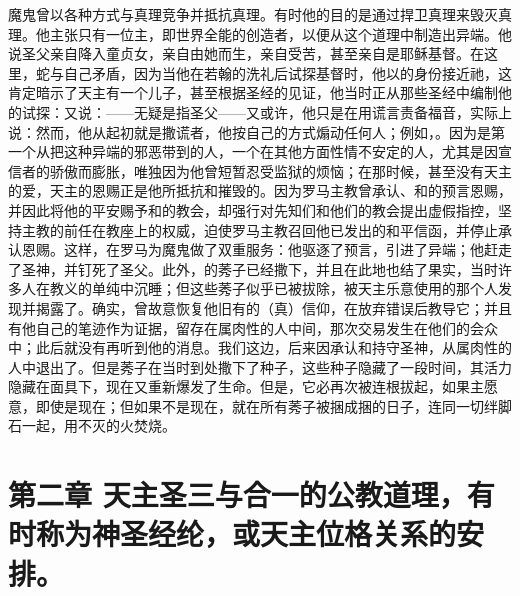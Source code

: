 魔鬼曾以各种方式与真理竞争并抵抗真理。有时他的目的是通过捍卫真理来毁灭真理。他主张只有一位主，即世界全能的创造者，以便从这个道理中制造出异端。他说圣父亲自降入童贞女，亲自由她而生，亲自受苦，甚至亲自是耶稣基督。在这里，蛇与自己矛盾，因为当他在若翰的洗礼后试探基督时，他以的身份接近祂，这肯定暗示了天主有一个儿子，甚至根据圣经的见证，他当时正从那些圣经中编制他的试探：又说：——无疑是指圣父——又或许，他只是在用谎言责备福音，实际上说：然而，他从起初就是撒谎者，他按自己的方式煽动任何人；例如，。因为是第一个从把这种异端的邪恶带到的人，一个在其他方面性情不安定的人，尤其是因宣信者的骄傲而膨胀，唯独因为他曾短暂忍受监狱的烦恼；在那时候，甚至没有天主的爱，天主的恩赐正是他所抵抗和摧毁的。因为罗马主教曾承认、和的预言恩赐，并因此将他的平安赐予和的教会，却强行对先知们和他们的教会提出虚假指控，坚持主教的前任在教座上的权威，迫使罗马主教召回他已发出的和平信函，并停止承认恩赐。这样，在罗马为魔鬼做了双重服务：他驱逐了预言，引进了异端；他赶走了圣神，并钉死了圣父。此外，的莠子已经撒下，并且在此地也结了果实，当时许多人在教义的单纯中沉睡；但这些莠子似乎已被拔除，被天主乐意使用的那个人发现并揭露了。确实，曾故意恢复他旧有的（真）信仰，在放弃错误后教导它；并且有他自己的笔迹作为证据，留存在属肉性的人中间，那次交易发生在他们的会众中；此后就没有再听到他的消息。我们这边，后来因承认和持守圣神，从属肉性的人中退出了。但是莠子在当时到处撒下了种子，这些种子隐藏了一段时间，其活力隐藏在面具下，现在又重新爆发了生命。但是，它必再次被连根拔起，如果主愿意，即使是现在；但如果不是现在，就在所有莠子被捆成捆的日子，连同一切绊脚石一起，用不灭的火焚烧。\par


\section{第二章 天主圣三与合一的公教道理，有时称为神圣经纶，或天主位格关系的安排。}

